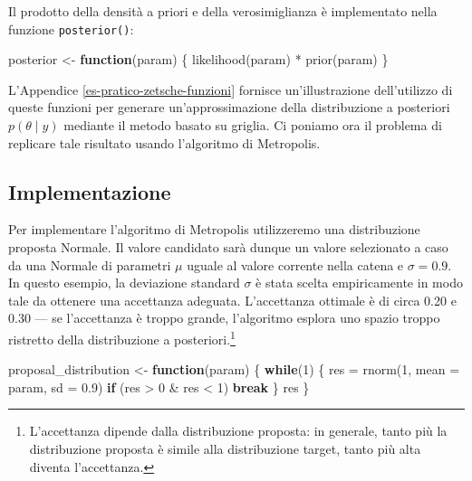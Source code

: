 \documentclass[
]{memoir}
\newenvironment{Shaded}{\begin{snugshade}}{\end{snugshade}}
\newcommand{\AttributeTok}[1]{\textcolor[rgb]{0.77,0.63,0.00}{#1}}
\newcommand{\ControlFlowTok}[1]{\textcolor[rgb]{0.13,0.29,0.53}{\textbf{#1}}}
\newcommand{\DecValTok}[1]{\textcolor[rgb]{0.00,0.00,0.81}{#1}}
\newcommand{\FloatTok}[1]{\textcolor[rgb]{0.00,0.00,0.81}{#1}}
\newcommand{\FunctionTok}[1]{\textcolor[rgb]{0.00,0.00,0.00}{#1}}
\newcommand{\NormalTok}[1]{#1}
\newcommand{\OtherTok}[1]{\textcolor[rgb]{0.56,0.35,0.01}{#1}}
\newcommand{\SpecialCharTok}[1]{\textcolor[rgb]{0.00,0.00,0.00}{#1}}
\begin{document}
Il prodotto della densità a priori e della verosimiglianza è implementato nella funzione \texttt{posterior()}:

\begin{Shaded}
\begin{Highlighting}[]
\NormalTok{posterior }\OtherTok{\textless{}{-}} \ControlFlowTok{function}\NormalTok{(param) \{}
  \FunctionTok{likelihood}\NormalTok{(param) }\SpecialCharTok{*} \FunctionTok{prior}\NormalTok{(param)}
\NormalTok{\}}
\end{Highlighting}
\end{Shaded}

L'Appendice \ref{es-pratico-zetsche-funzioni} fornisce un'illustrazione dell'utilizzo di queste funzioni per generare un'approssimazione della distribuzione a posteriori \(p(\theta \mid y)\) mediante il metodo basato su griglia. Ci poniamo ora il problema di replicare tale risultato usando l'algoritmo di Metropolis.

\hypertarget{implementazione}{%
\subsection{Implementazione}\label{implementazione}}

Per implementare l'algoritmo di Metropolis utilizzeremo una distribuzione proposta Normale. Il valore candidato sarà dunque un valore selezionato a caso da una Normale di parametri \(\mu\) uguale al valore corrente nella catena e \(\sigma = 0.9\). In questo esempio, la deviazione standard \(\sigma\) è stata scelta empiricamente in modo tale da ottenere una accettanza adeguata. L'accettanza ottimale è di circa 0.20 e 0.30 --- se l'accettanza è troppo grande, l'algoritmo esplora uno spazio troppo ristretto della distribuzione a posteriori.\footnote{L'accettanza dipende dalla distribuzione proposta: in generale, tanto più la distribuzione proposta è simile alla distribuzione target, tanto più alta diventa l'accettanza.}

\begin{Shaded}
\begin{Highlighting}[]
\NormalTok{proposal\_distribution }\OtherTok{\textless{}{-}} \ControlFlowTok{function}\NormalTok{(param) \{}
  \ControlFlowTok{while}\NormalTok{(}\DecValTok{1}\NormalTok{) \{}
\NormalTok{    res }\OtherTok{=} \FunctionTok{rnorm}\NormalTok{(}\DecValTok{1}\NormalTok{, }\AttributeTok{mean =}\NormalTok{ param, }\AttributeTok{sd =} \FloatTok{0.9}\NormalTok{)}
    \ControlFlowTok{if}\NormalTok{ (res }\SpecialCharTok{\textgreater{}} \DecValTok{0} \SpecialCharTok{\&}\NormalTok{ res }\SpecialCharTok{\textless{}} \DecValTok{1}\NormalTok{)}
      \ControlFlowTok{break}
\NormalTok{  \}}
\NormalTok{  res}
\NormalTok{\}}
\end{Highlighting}
\end{Shaded}
\end{document}
